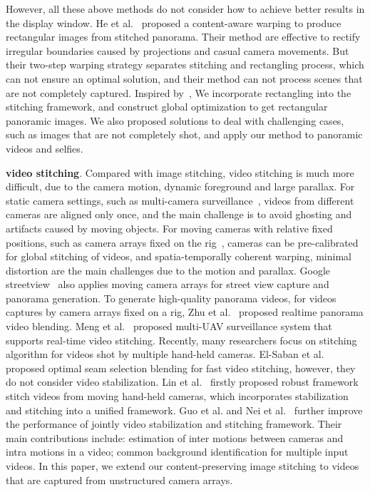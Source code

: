 \documentclass[10pt,journal,compsoc]{IEEEtran}
\begin{document}
However, all these above methods do not consider how to achieve better results in the display window. He et al.~\cite{journals/tog/HeC013} proposed a content-aware warping to produce rectangular images from stitched panorama.  Their method are effective to rectify irregular boundaries caused by projections and casual camera movements. But their two-step warping strategy separates stitching and rectangling process, which can not ensure an optimal solution, and their method can not process scenes that are not completely captured.
Inspired by~\cite{journals/tog/HeC013}, We incorporate rectangling into the stitching framework, and construct global optimization to get rectangular panoramic images.
We also proposed solutions to deal with challenging cases, such as images that are not completely shot, and apply our method to panoramic videos and selfies.

\textbf{video stitching}.
Compared with image stitching, video stitching is much more difficult, due to the camera motion, dynamic foreground and large parallax.
For static camera settings, such as multi-camera surveillance~\cite{journals/sensors/HeY16,journals/itiis/YinLWLZ14},  videos from different cameras are aligned only once, and the main challenge is to avoid ghosting and artifacts caused by moving objects.
For moving cameras with relative fixed positions, such as camera arrays fixed on the rig~\cite{journals/cgf/PerazziSZKWWG15}, cameras can be pre-calibrated for global stitching of videos, and spatia-temporally coherent warping, minimal distortion are the main challenges due to the motion and parallax.
Google streetview~\cite{journals/computer/AnguelovDFFLLOVW10} also applies moving camera arrays for street view capture and panorama generation.
To generate high-quality panorama videos, for videos captures by camera arrays fixed on a rig, Zhu et al.~\cite{journals/tip/ZhuLWZMLH18} proposed realtime panorama video blending.
Meng et al.~\cite{conf/mm/MengWL15} proposed multi-UAV surveillance system that supports real-time video stitching.
Recently, many researchers focus on stitching algorithm for videos shot by multiple hand-held cameras.
El-Saban et al.~\cite{conf/icip/El-SabanEKR11} proposed optimal seam selection blending for fast video stitching, however, they do not consider video stabilization.
Lin et al.~\cite{journals/cgf/LinLCZ16} firstly proposed robust framework stitch videos from moving hand-held cameras, which incorporates stabilization and stitching into a unified framework.
Guo et al. and Nei et al.~\cite{journals/tip/GuoLHZZG16,journals/tip/NieSZSL18} further improve the performance of  jointly video stabilization and stitching framework.
Their main contributions include: estimation of inter motions between cameras and intra motions in a video; common background identification for multiple input videos.
In this paper, we extend our content-preserving image stitching to videos that are captured from unstructured camera arrays\cite{journals/cgf/PerazziSZKWWG15}.
\end{document}
